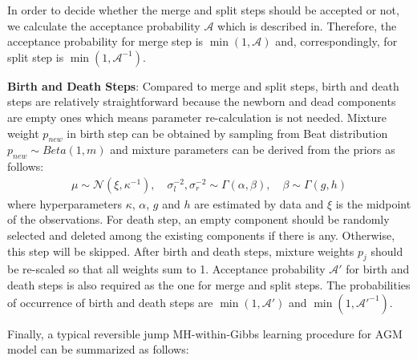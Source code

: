 \documentclass[conference]{IEEEtran}
\begin{document}
In order to decide whether the merge and split steps should be accepted or not, we calculate the acceptance probability $\mathcal{A}$ which is described in\cite{b1}. Therefore, the acceptance probability for merge step is $\min(1,\mathcal{A})$ and, correspondingly, for split step is $\min(1,\mathcal{A}^{-1})$.

\textbf{Birth and Death Steps}: Compared to merge and split steps, birth and death steps are relatively straightforward because the newborn and dead components are empty ones which means parameter re-calculation is not needed. Mixture weight $p_{new}$ in birth step can be obtained by sampling from Beat distribution $p_{new} \sim Beta(1,m)$ and mixture parameters can be derived from the priors as follows\cite{casella}:
\begin{align}
\mu \sim \mathcal{N}(\xi,\kappa^{-1}), \quad \sigma_{l}^{-2},\sigma_{r}^{-2} \sim \Gamma(\alpha,\beta), \quad \beta \sim \Gamma(g,h)
\label{eq:prior}
\end{align}
where hyperparameters $\kappa$, $\alpha$, $g$ and $h$ are estimated by data and $\xi$ is the midpoint of the observations. For death step, an empty component should be randomly selected and deleted among the existing components if there is any. Otherwise, this step will be skipped. After birth and death steps, mixture weights $p_j$ should be re-scaled so that all weights sum to 1. Acceptance probability $\mathcal{A}'$ for birth and death steps is also required as the one for merge and split steps. The probabilities of occurrence of birth and death steps are $\min(1,\mathcal{A}')$ and $\min(1,\mathcal{A}'^{-1})$\cite{b1}.

Finally, a typical reversible jump MH-within-Gibbs learning procedure for AGM model can be summarized as follows:
\bigskip
\end{document}
